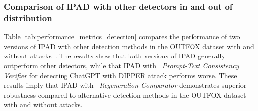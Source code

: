 \begin{table}[ht!]
  \centering
  \caption{IPAD with ~\textit{Regeneration Comparator} performance on different LLMs}
  \label{tab:performance_metrics_setting2}
\end{table}


\subsubsection{Comparison of IPAD with other detectors in and out of distribution}
Table \ref{tab:performance_metrics_detection} compares the performance of two versions of IPAD with other detection methods in the OUTFOX dataset with and without attacks~\cite{r3}. The results show that both versions of IPAD generally outperform other detectors, while that IPAD with ~\textit{Prompt-Text Consistency Verifier} for detecting ChatGPT with DIPPER attack performs worse. These results imply that IPAD with ~\textit{Regeneration Comparator} demonstrates superior robustness compared to alternative detection methods in the OUTFOX dataset with and without attacks.

